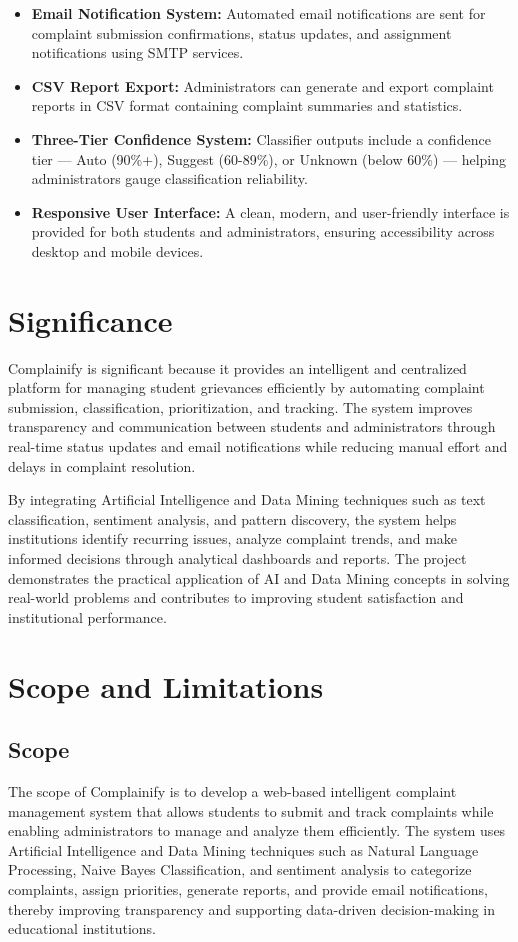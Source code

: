 \documentclass[12pt,a4paper]{report}
\begin{document}
\begin{itemize}[nolistsep]
    \item \textbf{Email Notification System:} Automated email notifications are sent for complaint submission confirmations, status updates, and assignment notifications using SMTP services.
    
    \item \textbf{CSV Report Export:} Administrators can generate and export complaint reports in CSV format containing complaint summaries and statistics.
    
    \item \textbf{Three-Tier Confidence System:} Classifier outputs include a confidence tier — Auto (90\%+), Suggest (60-89\%), or Unknown (below 60\%) — helping administrators gauge classification reliability.
    
    \item \textbf{Responsive User Interface:} A clean, modern, and user-friendly interface is provided for both students and administrators, ensuring accessibility across desktop and mobile devices.
\end{itemize}

\section{Significance}
Complainify is significant because it provides an intelligent and centralized platform for managing student grievances efficiently by automating complaint submission, classification, prioritization, and tracking. The system improves transparency and communication between students and administrators through real-time status updates and email notifications while reducing manual effort and delays in complaint resolution.

By integrating Artificial Intelligence and Data Mining techniques such as text classification, sentiment analysis, and pattern discovery, the system helps institutions identify recurring issues, analyze complaint trends, and make informed decisions through analytical dashboards and reports. The project demonstrates the practical application of AI and Data Mining concepts in solving real-world problems and contributes to improving student satisfaction and institutional performance.

\section{Scope and Limitations}

\subsection{Scope}
The scope of Complainify is to develop a web-based intelligent complaint management system that allows students to submit and track complaints while enabling administrators to manage and analyze them efficiently. The system uses Artificial Intelligence and Data Mining techniques such as Natural Language Processing, Naive Bayes Classification, and sentiment analysis to categorize complaints, assign priorities, generate reports, and provide email notifications, thereby improving transparency and supporting data-driven decision-making in educational institutions.
\end{document}
